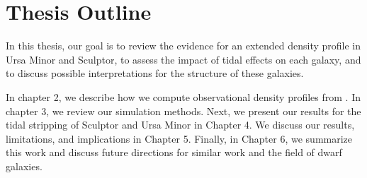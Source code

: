 \section{Thesis Outline}\label{thesis-outline}

In this thesis, our goal is to review the evidence for an extended
density profile in Ursa Minor and Sculptor, to assess the impact of
tidal effects on each galaxy, and to discuss possible interpretations
for the structure of these galaxies.

In chapter 2, we describe how we compute observational density profiles
from \citet{jensen+2024}. In chapter 3, we review our simulation
methods. Next, we present our results for the tidal stripping of
Sculptor and Ursa Minor in Chapter 4. We discuss our results,
limitations, and implications in Chapter 5. Finally, in Chapter 6, we
summarize this work and discuss future directions for similar work and
the field of dwarf galaxies.
